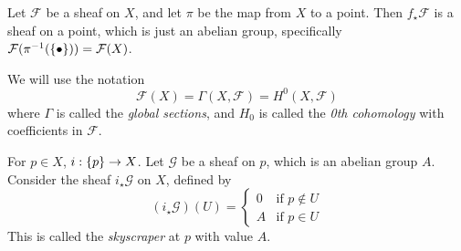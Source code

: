 \begin{example}
    Let \( \mathcal F \) be a sheaf on \( X \), and let \( \pi \) be the map from \( X \) to a point.
    Then \( f_\star \mathcal F \) is a sheaf on a point, which is just an abelian group, specifically \( \mathcal F(\pi^{-1}(\qty{\bullet})) = \mathcal F(X) \).
\end{example}
We will use the notation
\[ \mathcal F(X) = \Gamma(X, \mathcal F) = H^0(X, \mathcal F) \]
where \( \Gamma \) is called the \emph{global sections}, and \( H_0 \) is called the \emph{0th cohomology} with coefficients in \( \mathcal F \).

For \( p \in X \), \( i : \qty{p} \to X \).
Let \( \mathcal G \) be a sheaf on \( p \), which is an abelian group \( A \).
Consider the sheaf \( i_\star \mathcal G \) on \( X \), defined by
\[ (i_\star \mathcal G)(U) = \begin{cases}
    0 & \text{if } p \notin U \\
    A & \text{if } p \in U
\end{cases} \]
This is called the \emph{skyscraper} at \( p \) with value \( A \).
